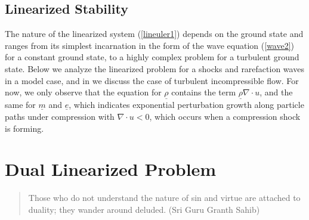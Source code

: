 \section{Linearized Stability}
The nature of the linearized system (\ref{lineuler1}) depends
on the ground state and ranges from its simplest incarnation
in the form of the wave equation (\ref{wave2})
for a constant ground state, to a highly complex problem for 
a turbulent ground state. Below we analyze the linearized 
problem for a shocks and rarefaction waves in a model case,
and in \cite{ambsflow} we discuss the case of turbulent incompressible
flow. For now, we only observe that the equation for $\underline{\rho}$  
contains the term $\underline{\rho}\nabla\cdot u$, and the same for $\underline{m}$ and $\underline{e}$,
which indicates exponential perturbation growth
along particle paths under compression with $\nabla\cdot u <0$,
which occurs when a compression shock is forming.


  
\chapter{Dual Linearized Problem}


\small

\begin{quote}
Those who do not understand the nature of sin and virtue are attached 
to duality; they wander around deluded. (Sri Guru Granth Sahib)
\end{quote}
\normalsize



